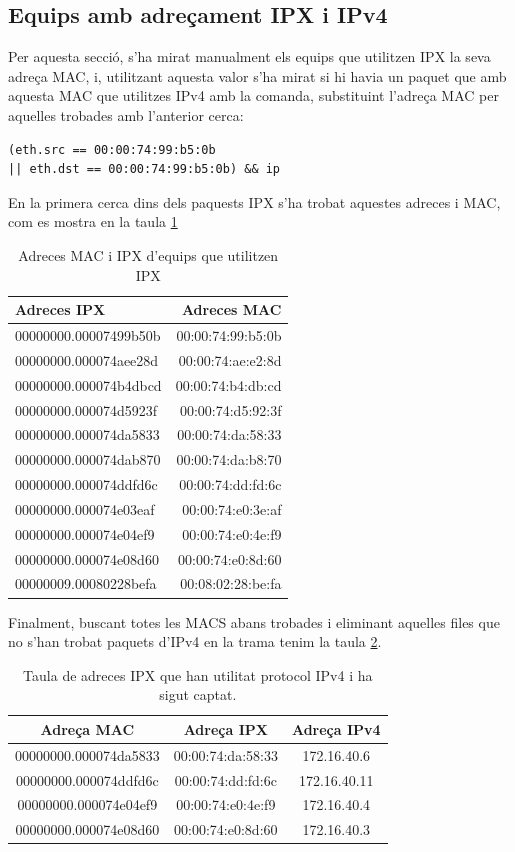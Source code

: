 \documentclass{article}
\begin{document}
\subsection{Equips amb adreçament IPX i IPv4}
Per aquesta secció, s'ha mirat manualment els equips que utilitzen IPX 
la seva adreça MAC, i, utilitzant aquesta valor s'ha mirat si hi havia un 
paquet que amb aquesta MAC que utilitzes IPv4 amb la comanda, substituint
l'adreça MAC per aquelles trobades amb l'anterior cerca:\\
\begin{lstlisting}
(eth.src == 00:00:74:99:b5:0b 
|| eth.dst == 00:00:74:99:b5:0b) && ip
\end{lstlisting}
En la primera cerca dins dels paquests IPX s'ha trobat aquestes adreces i MAC,
com es mostra en la taula \ref{ipx:mac}
\begin{table}[!h]
\centering
\begin{tabular}{|l|r|}
\hline
Adreces IPX &Adreces MAC\\
\hline
00000000.00007499b50b &00:00:74:99:b5:0b\\
\hline
00000000.000074aee28d &00:00:74:ae:e2:8d\\
\hline
00000000.000074b4dbcd &00:00:74:b4:db:cd\\
\hline
00000000.000074d5923f &00:00:74:d5:92:3f\\
\hline
00000000.000074da5833 &00:00:74:da:58:33\\
\hline
00000000.000074dab870 &00:00:74:da:b8:70\\
\hline
00000000.000074ddfd6c &00:00:74:dd:fd:6c\\
\hline
00000000.000074e03eaf &00:00:74:e0:3e:af\\
\hline
00000000.000074e04ef9 &00:00:74:e0:4e:f9\\
\hline
00000000.000074e08d60 &00:00:74:e0:8d:60\\
\hline
00000009.00080228befa &00:08:02:28:be:fa\\
\hline
\end{tabular}
\caption{Adreces MAC i IPX d'equips que utilitzen IPX}
\label{ipx:mac}
\end{table}
Finalment, buscant totes les MACS abans trobades i eliminant aquelles 
files que no s'han trobat paquets d'IPv4 en la trama tenim la taula \ref{ipx:ipv4}.
\begin{table}[!h]
\centering
\begin{tabular}{ |c|c|c| }
\hline
Adreça MAC &Adreça IPX &Adreça IPv4\\
\hline
00000000.000074da5833 &00:00:74:da:58:33 &172.16.40.6\\
\hline
00000000.000074ddfd6c &00:00:74:dd:fd:6c &172.16.40.11\\
\hline
00000000.000074e04ef9 &00:00:74:e0:4e:f9 &172.16.40.4\\
\hline
00000000.000074e08d60 &00:00:74:e0:8d:60 &172.16.40.3\\
\hline
\end{tabular}
\caption{Taula de adreces IPX que han utilitat protocol IPv4 i ha sigut captat.}
\label{ipx:ipv4}
\end{table}
\end{document}
